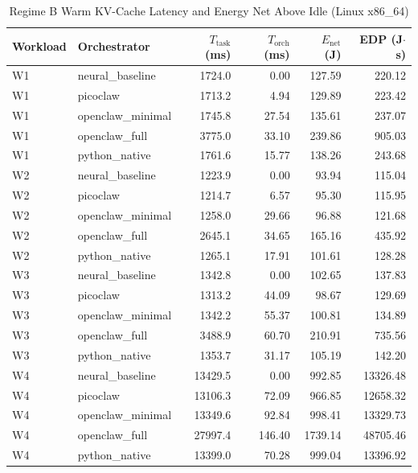 \begin{table}[t]
\centering\small
\caption{Regime B Warm KV-Cache Latency and Energy Net Above Idle (Linux x86_64)}
\label{tab:linux_warm_cache}
\begin{tabular}{llrrrr}
\toprule
Workload & Orchestrator & $T_{\text{task}}$ (ms) & $T_{\text{orch}}$ (ms) & $E_{\text{net}}$ (J) & EDP (J$\cdot$s) \\
\midrule
W1 & neural\_baseline & 1724.0 & 0.00 & 127.59 & 220.12 \\
W1 & picoclaw & 1713.2 & 4.94 & 129.89 & 223.42 \\
W1 & openclaw\_minimal & 1745.8 & 27.54 & 135.61 & 237.07 \\
W1 & openclaw\_full & 3775.0 & 33.10 & 239.86 & 905.03 \\
W1 & python\_native & 1761.6 & 15.77 & 138.26 & 243.68 \\
W2 & neural\_baseline & 1223.9 & 0.00 & 93.94 & 115.04 \\
W2 & picoclaw & 1214.7 & 6.57 & 95.30 & 115.95 \\
W2 & openclaw\_minimal & 1258.0 & 29.66 & 96.88 & 121.68 \\
W2 & openclaw\_full & 2645.1 & 34.65 & 165.16 & 435.92 \\
W2 & python\_native & 1265.1 & 17.91 & 101.61 & 128.28 \\
W3 & neural\_baseline & 1342.8 & 0.00 & 102.65 & 137.83 \\
W3 & picoclaw & 1313.2 & 44.09 & 98.67 & 129.69 \\
W3 & openclaw\_minimal & 1342.2 & 55.37 & 100.81 & 134.89 \\
W3 & openclaw\_full & 3488.9 & 60.70 & 210.91 & 735.56 \\
W3 & python\_native & 1353.7 & 31.17 & 105.19 & 142.20 \\
W4 & neural\_baseline & 13429.5 & 0.00 & 992.85 & 13326.48 \\
W4 & picoclaw & 13106.3 & 72.09 & 966.85 & 12658.32 \\
W4 & openclaw\_minimal & 13349.6 & 92.84 & 998.41 & 13329.73 \\
W4 & openclaw\_full & 27997.4 & 146.40 & 1739.14 & 48705.46 \\
W4 & python\_native & 13399.0 & 70.28 & 999.04 & 13396.92 \\
\bottomrule
\end{tabular}
\end{table}
